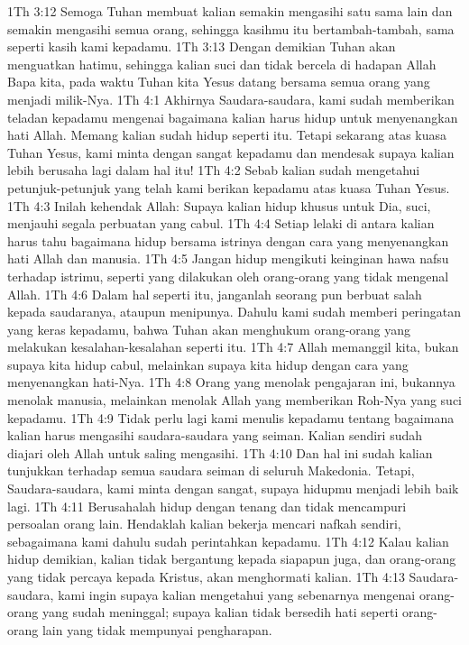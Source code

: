1Th 3:12  Semoga Tuhan membuat kalian semakin mengasihi satu sama lain dan semakin mengasihi semua orang, sehingga kasihmu itu bertambah-tambah, sama seperti kasih kami kepadamu.
1Th 3:13  Dengan demikian Tuhan akan menguatkan hatimu, sehingga kalian suci dan tidak bercela di hadapan Allah Bapa kita, pada waktu Tuhan kita Yesus datang bersama semua orang yang menjadi milik-Nya.
1Th 4:1  Akhirnya Saudara-saudara, kami sudah memberikan teladan kepadamu mengenai bagaimana kalian harus hidup untuk menyenangkan hati Allah. Memang kalian sudah hidup seperti itu. Tetapi sekarang atas kuasa Tuhan Yesus, kami minta dengan sangat kepadamu dan mendesak supaya kalian lebih berusaha lagi dalam hal itu!
1Th 4:2  Sebab kalian sudah mengetahui petunjuk-petunjuk yang telah kami berikan kepadamu atas kuasa Tuhan Yesus.
1Th 4:3  Inilah kehendak Allah: Supaya kalian hidup khusus untuk Dia, suci, menjauhi segala perbuatan yang cabul.
1Th 4:4  Setiap lelaki di antara kalian harus tahu bagaimana hidup bersama istrinya dengan cara yang menyenangkan hati Allah dan manusia.
1Th 4:5  Jangan hidup mengikuti keinginan hawa nafsu terhadap istrimu, seperti yang dilakukan oleh orang-orang yang tidak mengenal Allah.
1Th 4:6  Dalam hal seperti itu, janganlah seorang pun berbuat salah kepada saudaranya, ataupun menipunya. Dahulu kami sudah memberi peringatan yang keras kepadamu, bahwa Tuhan akan menghukum orang-orang yang melakukan kesalahan-kesalahan seperti itu.
1Th 4:7  Allah memanggil kita, bukan supaya kita hidup cabul, melainkan supaya kita hidup dengan cara yang menyenangkan hati-Nya.
1Th 4:8  Orang yang menolak pengajaran ini, bukannya menolak manusia, melainkan menolak Allah yang memberikan Roh-Nya yang suci kepadamu.
1Th 4:9  Tidak perlu lagi kami menulis kepadamu tentang bagaimana kalian harus mengasihi saudara-saudara yang seiman. Kalian sendiri sudah diajari oleh Allah untuk saling mengasihi.
1Th 4:10  Dan hal ini sudah kalian tunjukkan terhadap semua saudara seiman di seluruh Makedonia. Tetapi, Saudara-saudara, kami minta dengan sangat, supaya hidupmu menjadi lebih baik lagi.
1Th 4:11  Berusahalah hidup dengan tenang dan tidak mencampuri persoalan orang lain. Hendaklah kalian bekerja mencari nafkah sendiri, sebagaimana kami dahulu sudah perintahkan kepadamu.
1Th 4:12  Kalau kalian hidup demikian, kalian tidak bergantung kepada siapapun juga, dan orang-orang yang tidak percaya kepada Kristus, akan menghormati kalian.
1Th 4:13  Saudara-saudara, kami ingin supaya kalian mengetahui yang sebenarnya mengenai orang-orang yang sudah meninggal; supaya kalian tidak bersedih hati seperti orang-orang lain yang tidak mempunyai pengharapan.
